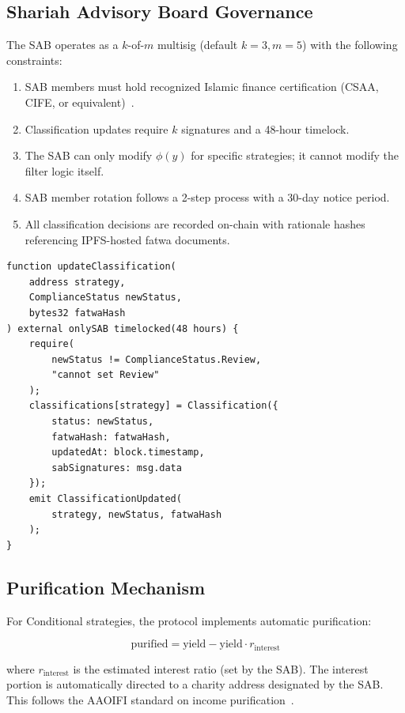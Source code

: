 \documentclass[11pt,twocolumn]{article}
\theoremstyle{definition}
\begin{document}
\subsection{Shariah Advisory Board Governance}

The SAB operates as a $k$-of-$m$ multisig (default $k=3, m=5$) with the following constraints:

\begin{enumerate}[nosep]
  \item SAB members must hold recognized Islamic finance certification (CSAA, CIFE, or equivalent)~\cite{aaoifi2015}.
  \item Classification updates require $k$ signatures and a 48-hour timelock.
  \item The SAB can only modify $\phi(y)$ for specific strategies; it cannot modify the filter logic itself.
  \item SAB member rotation follows a 2-step process with a 30-day notice period.
  \item All classification decisions are recorded on-chain with rationale hashes referencing IPFS-hosted fatwa documents.
\end{enumerate}

\begin{lstlisting}[language=Solidity,caption=ShariaFilter classification update]
function updateClassification(
    address strategy,
    ComplianceStatus newStatus,
    bytes32 fatwaHash
) external onlySAB timelocked(48 hours) {
    require(
        newStatus != ComplianceStatus.Review,
        "cannot set Review"
    );
    classifications[strategy] = Classification({
        status: newStatus,
        fatwaHash: fatwaHash,
        updatedAt: block.timestamp,
        sabSignatures: msg.data
    });
    emit ClassificationUpdated(
        strategy, newStatus, fatwaHash
    );
}
\end{lstlisting}

\subsection{Purification Mechanism}

For Conditional strategies, the protocol implements automatic purification:

\begin{equation}
  \text{purified} = \text{yield} - \text{yield} \cdot r_{\text{interest}}
\end{equation}

where $r_{\text{interest}}$ is the estimated interest ratio (set by the SAB). The interest portion is automatically directed to a charity address designated by the SAB. This follows the AAOIFI standard on income purification~\cite{aaoifi2015}.
\end{document}

